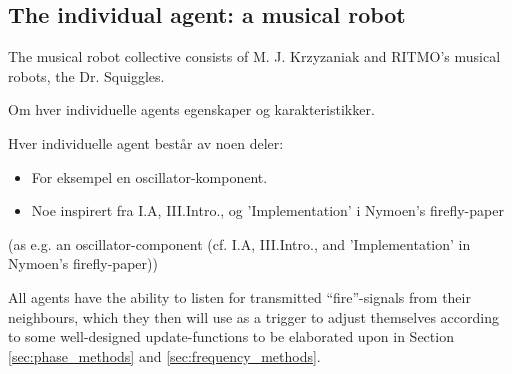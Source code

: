 



	
	\subsection{The individual agent: a musical robot}
	\label{subsec:agent}
		The musical robot collective consists of M. J. Krzyzaniak and RITMO's musical robots, the Dr. Squiggles. \nl
		
		Om hver individuelle agents egenskaper og karakteristikker.
		
		Hver individuelle agent består av noen deler:
		\begin{itemize}
			\item For eksempel en oscillator-komponent.
			\item Noe inspirert fra I.A, III.Intro., og 'Implementation' i Nymoen's firefly-paper
		\end{itemize}
		
		(as e.g. an oscillator-component (cf. I.A, III.Intro., and 'Implementation' in Nymoen's firefly-paper))
		
		All agents have the ability to listen for transmitted ``fire''-signals from their neighbours, which they then will use as a trigger to adjust themselves according to some well-designed update-functions to be elaborated upon in Section \ref{sec:phase_methods} and \ref{sec:frequency_methods}.

